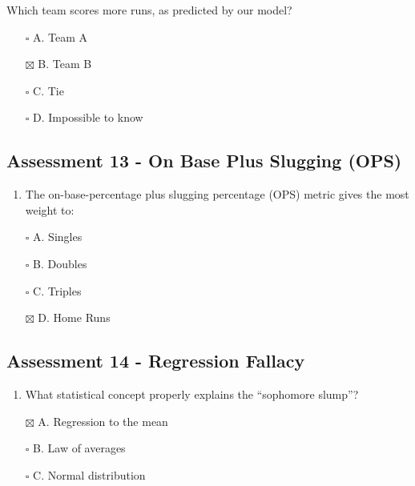 \documentclass[
]{article}
\providecommand{\tightlist}{%
  \setlength{\itemsep}{0pt}\setlength{\parskip}{0pt}}
\begin{document}
Which team scores more runs, as predicted by our model?

\begin{itemize}
\tightlist
\item[$\square$]
  A. Team A
\item[$\boxtimes$]
  B. Team B
\item[$\square$]
  C. Tie
\item[$\square$]
  D. Impossible to know
\end{itemize}

\hypertarget{assessment-13---on-base-plus-slugging-ops}{%
\subsection{Assessment 13 - On Base Plus Slugging
(OPS)}\label{assessment-13---on-base-plus-slugging-ops}}

\begin{enumerate}
\def\labelenumi{\arabic{enumi}.}
\tightlist
\item
  The on-base-percentage plus slugging percentage (OPS) metric gives the
  most weight to:
\end{enumerate}

\begin{itemize}
\tightlist
\item[$\square$]
  A. Singles
\item[$\square$]
  B. Doubles
\item[$\square$]
  C. Triples
\item[$\boxtimes$]
  D. Home Runs
\end{itemize}

\hypertarget{assessment-14---regression-fallacy}{%
\subsection{Assessment 14 - Regression
Fallacy}\label{assessment-14---regression-fallacy}}

\begin{enumerate}
\def\labelenumi{\arabic{enumi}.}
\tightlist
\item
  What statistical concept properly explains the ``sophomore slump''?
\end{enumerate}

\begin{itemize}
\tightlist
\item[$\boxtimes$]
  A. Regression to the mean
\item[$\square$]
  B. Law of averages
\item[$\square$]
  C. Normal distribution
\end{itemize}
\end{document}
